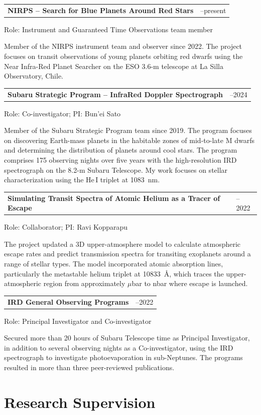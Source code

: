 \documentclass[10pt,a4paper]{article}
\makeatletter
\newcommand{\projectentry}[4]{%
\begin{tabularx}{\textwidth}{
    @{}
    >{\raggedright\arraybackslash}X
    >{\raggedleft\arraybackslash}p{2.5cm}
    @{}
}
\textbf{#1} & #2
\end{tabularx}

#3

{\color{entrylight}#4\par}

\vspace{4pt}
}
\makeatother
\begin{document}
\projectentry
{NIRPS -- Search for Blue Planets Around Red Stars}
{2022--present}
{\vspace{-1mm}Role: Instrument and Guaranteed Time Observations team member}
{\vspace{-1.5mm}Member of the NIRPS instrument team and observer since 2022.
The project focuses on transit observations of young planets orbiting
red dwarfs using the Near Infra-Red Planet Searcher on the ESO 3.6-m
telescope at La Silla Observatory, Chile.}


\projectentry
{Subaru Strategic Program -- InfraRed Doppler Spectrograph}
{2019--2024}
{\vspace{-1mm}Role: Co-investigator; PI: Bun'ei Sato}
{\vspace{-1.5mm}Member of the Subaru Strategic Program team since 2019. The program
focuses on discovering Earth-mass planets in the habitable zones of
mid-to-late M dwarfs and determining the distribution of planets around
cool stars. The program comprises 175 observing nights over five years
with the high-resolution IRD spectrograph on the 8.2-m Subaru Telescope.
My work focuses on stellar characterization using the He\,I triplet at
1083~nm.}


\projectentry
{Simulating Transit Spectra of Atomic Helium as a Tracer of Escape}
{2020--2022}
{\vspace{-1mm}Role: Collaborator; PI: Ravi Kopparapu}
{\vspace{-1.5mm}The project updated a 3D upper-atmosphere model to
calculate atmospheric escape rates and predict transmission spectra for
transiting exoplanets around a range of stellar types. The model
incorporated atomic absorption lines, particularly the metastable
helium triplet at 10833~\AA, which traces the upper-atmospheric region
from approximately $\mu$bar to nbar where escape
is launched.}


\projectentry
{IRD General Observing Programs}
{2019--2022}
{\vspace{-1mm}Role: Principal Investigator and Co-investigator}
{\vspace{-1.5mm}Secured more than 20 hours of Subaru Telescope time as Principal
Investigator, in addition to several observing nights as a
Co-investigator, using the IRD spectrograph to investigate
photoevaporation in sub-Neptunes. The programs resulted in more than
three peer-reviewed publications.}


\section{Research Supervision}
\end{document}
